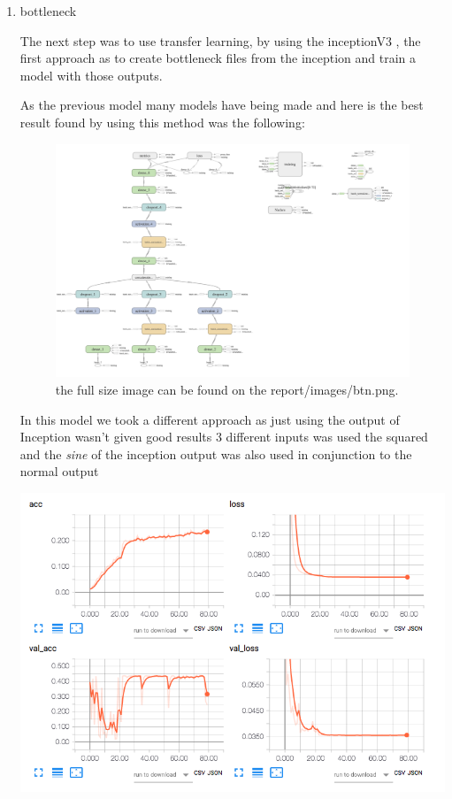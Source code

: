 \documentclass[11pt]{article}
\begin{document}
\begin{enumerate}
\item bottleneck
\label{sec:org25e51c5}

The next step was to use transfer learning, by using the inceptionV3
\cite{szegedy2016rethinking}, the first approach as to create bottleneck files
from the inception and train a model with those outputs.

As the previous model many models have being made and here is the best result 
found by using this method was the following:

\begin{figure}[htbp]
\centering
\includegraphics[width=.9\linewidth]{./images/btn.png}
\caption{the full size image can be found on the report/images/btn.png.}
\end{figure}

In this model we took a different approach as just using the output of
Inception wasn't given good results 3 different inputs was used the squared
and the \emph{sine} of the inception output was also used in conjunction to the
normal output 

\begin{center}
\includegraphics[width=.9\linewidth]{./images/btnLoss.png}
\end{center} 


\end{enumerate}
\end{document}
